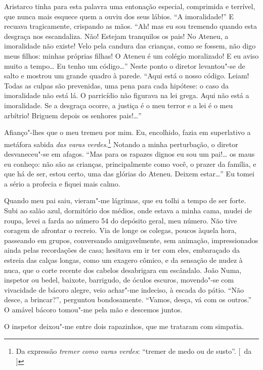 Aristarco tinha para esta palavra uma
entonação especial, comprimida e terrível, que nunca mais esquece quem
a ouviu dos seus lábios. ``A imoralidade!'' E recuava tragicamente,
crispando as mãos. ``Ah! mas eu sou tremendo quando esta desgraça nos
escandaliza. Não! Estejam tranquilos os pais! No Ateneu, a imoralidade
não existe! Velo pela candura das crianças, como se fossem, não digo
meus filhos: minhas próprias filhas! O Ateneu é um colégio moralizado!
E eu aviso muito a tempo\ldots{} Eu tenho um código\ldots{}'' Neste ponto o
diretor levantou"-se de salto e mostrou um grande quadro à parede.
``Aqui está o nosso código. Leiam! Todas as culpas são prevenidas, uma
pena para cada hipótese: o caso da imoralidade não está lá. O
parricídio não figurava na lei grega. Aqui não está a imoralidade. Se a
desgraça ocorre, a justiça é o meu terror e a lei é o meu arbítrio!
Briguem depois os senhores pais!\ldots{}'' 

Afianço"-lhes que o meu tremeu
por mim. Eu, encolhido, fazia em superlativo a metáfora sabida 
\textit{das varas verdes}.\footnote{ Da expressão \textit{tremer como varas verdes}: 
``tremer de medo ou de susto''. [~da ]} Notando a minha perturbação, o diretor desvaneceu"-se 
em afagos. ``Mas para os rapazes dignos eu sou um pai!\ldots{} os maus eu
conheço: não são as crianças, principalmente como você, o prazer da
família, e que há de ser, estou certo, uma das glórias do Ateneu.
Deixem estar\ldots{}'' Eu tomei a sério a profecia e fiquei mais calmo.

Quando meu pai saiu, vieram"-me lágrimas, que eu tolhi a tempo de ser
forte. Subi ao salão azul, dormitório dos médios, onde estava a minha
cama, mudei de roupa, levei a farda ao número 54 do depósito geral, meu
número. Não tive coragem de afrontar o recreio. Via de longe os
colegas, poucos àquela hora, passeando em grupos, conversando
amigavelmente, sem animação, impressionados ainda pelas recordações de
casa; hesitava em ir ter com eles, embaraçado da estreia das calças
longas, como um exagero cômico, e da sensação de nudez à nuca, que o
corte recente dos cabelos desabrigara em escândalo. João Numa, inspetor
ou bedel, baixote, barrigudo, de óculos escuros, movendo"-se com
vivacidade de bácoro alegre, veio achar"-me indeciso, à escada do
pátio. ``Não desce, a brincar?'', perguntou bondosamente. ``Vamos, desça,
vá com os outros.'' O amável bácoro tomou"-me pela mão e descemos juntos. 

O inspetor deixou"-me entre dois rapazinhos, que me trataram
com simpatia. 

